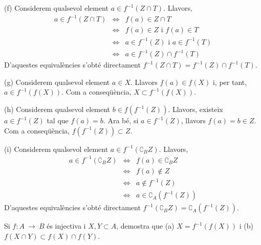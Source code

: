 \begin{solucio}
(f) Considerem qualsevol element $a\in f^{-1}(Z\cap T)$. Llavors,%
\begin{equation*}
\begin{array}{lll}
a\in f^{-1}(Z\cap T) & \Longleftrightarrow & f(a)\in Z\cap T \\
& \Longleftrightarrow & f(a)\in Z\text{ \ i \ }f(a)\in T \\
& \Longleftrightarrow & a\in f^{-1}(Z)\text{ \ i \ }a\in f^{-1}(T) \\
& \Longleftrightarrow & a\in f^{-1}(Z)\cap f^{-1}(T)%
\end{array}%
\end{equation*}%
D'aquestes equival\`{e}ncies s'obt\'{e} directament $f^{-1}(Z\cap
T)=f^{-1}(Z)\cap f^{-1}(T)$.

(g) Considerem qualsevol element $a\in X$. Llavors $f(a)\in f(X)$ i, per
tant, $a\in f^{-1}\left( f(X)\right) $. Com a conseq\"{u}\`{e}ncia, $%
X\subset f^{-1}\left( f(X)\right) $.

(h) Considerem qualsevol element $b\in f\left( f^{-1}(Z)\right) $. Llavors,
existeix $a\in f^{-1}(Z)$ tal que $f(a)=b$. Ara b\'{e}, si $a\in f^{-1}(Z)$,
llavors $f(a)=b\in Z$. Com a conseq\"{u}\`{e}ncia, $f\left( f^{-1}(Z)\right)
\subset Z$.

(i) Considerem qualsevol element $a\in f^{-1}\left( \complement _{B}Z\right)
$. Llavors,%
\begin{equation*}
\begin{array}{lll}
a\in f^{-1}\left( \complement _{B}Z\right) & \Longleftrightarrow & f(a)\in
\complement _{B}Z \\
& \Longleftrightarrow & f(a)\notin Z \\
& \Longleftrightarrow & a\notin f^{-1}(Z) \\
& \Longleftrightarrow & a\in \complement _{A}\left( f^{-1}(Z)\right)%
\end{array}%
\end{equation*}%
D'aquestes equival\`{e}ncies s'obt\'{e} directament $f^{-1}\left(
\complement _{B}Z\right) =\complement _{A}\left( f^{-1}(Z)\right) $.
\end{solucio}

\begin{exercici}
Si $f:A~\longrightarrow ~B$ \'{e}s injectiva i $X,Y\subset A$, demostra que
(a) $X=f^{-1}\left( f(X)\right) $ i (b) $f(X\cap Y)\subset f(X)\cap f(Y)$.
\end{exercici}

